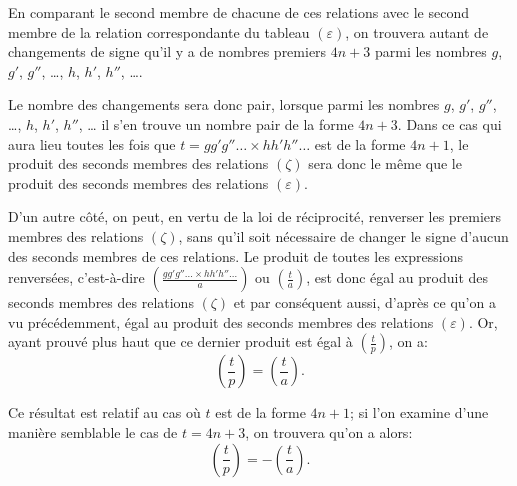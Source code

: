 \documentclass[11pt]{article}
\newcommand{\leg}[2]{\left(\frac{#1}{#2}\right)}
\newcommand{\unitid}[1]{\hypertarget{#1}{}}
\begin{document}
\unitid{dirichlet.v1.p04b.par.024}En comparant le second membre de chacune de ces relations avec le second membre de la relation correspondante du tableau $(\varepsilon)$, on trouvera autant de changements de signe qu'il y a de nombres premiers $4n+3$ parmi les nombres $g$, $g'$, $g''$, \ldots{}, $h$, $h'$, $h''$, \ldots{}.

\unitid{dirichlet.v1.p04b.par.025}Le nombre des changements sera donc pair, lorsque parmi les nombres $g$, $g'$, $g''$, \ldots{}, $h$, $h'$, $h''$, \ldots{} il s'en trouve un nombre pair de la forme $4n+3$. Dans ce cas qui aura lieu toutes les fois que $t=gg'g''\ldots{}\times hh'h''\ldots$ est de la forme $4n+1$, le produit des seconds membres des relations $(\zeta)$ sera donc le même que le produit des seconds membres des relations $(\varepsilon)$.

\unitid{dirichlet.v1.p04b.par.026}D'un autre côté, on peut, en vertu de la loi de réciprocité, renverser les premiers membres des relations $(\zeta)$, sans qu'il soit nécessaire de changer le signe d'aucun des seconds membres de ces relations. Le produit de toutes les expressions renversées, c'est-à-dire $\leg{gg'g''\ldots{}\times hh'h''\ldots}{a}$ ou $\leg{t}{a}$, est donc égal au produit des seconds membres des relations $(\zeta)$ et par conséquent aussi, d'après ce qu'on a vu précédemment, égal au produit des seconds membres des relations $(\varepsilon)$. Or, ayant prouvé plus haut que ce dernier produit est égal à $\leg{t}{p}$, on a:
\unitid{dirichlet.v1.p04b.eq.020}
\[
\leg{t}{p}=\leg{t}{a}.
\]

\unitid{dirichlet.v1.p04b.par.027}Ce résultat est relatif au cas où $t$ est de la forme $4n+1$; si l'on examine d'une manière semblable le cas de $t=4n+3$, on trouvera qu'on a alors:
\unitid{dirichlet.v1.p04b.eq.021}
\[
\leg{t}{p}=-\leg{t}{a}.
\]
\end{document}
